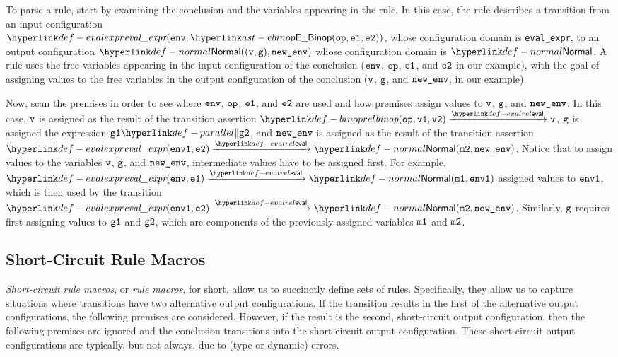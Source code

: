 To parse a rule, start by examining the conclusion and the variables appearing in the rule.
In this case, the rule describes a transition from an input configuration \\
$\evalexpr{ \env, \EBinop(\op, \veone, \vetwo) }$,
whose configuration domain is \texttt{eval\_expr}, to an output configuration $\Normal((\vv, \vg), \newenv)$
whose configuration domain is $\Normal$.
%
A rule uses the free variables appearing in the input configuration of the conclusion
($\texttt{env}$, $\texttt{op}$, $\texttt{e1}$, and $\texttt{e2}$ in our example),
with the goal of assigning values to the free variables in the output configuration
of the conclusion ($\texttt{v}$, $\texttt{g}$, and $\texttt{new\_env}$, in our example).

Now, scan the premises in order to see where $\texttt{env}$, $\texttt{op}$, $\texttt{e1}$, and $\texttt{e2}$ are used and how
premises assign values to $\texttt{v}$, $\texttt{g}$, and $\texttt{new\_env}$.
%
In this case, $\texttt{v}$ is assigned as the result of the transition assertion
$\binoprel(\op, \vvone, \vvtwo) \evalarrow \vv$,
$\texttt{g}$ is assigned the expression $\vgone \parallelcomp \vgtwo$,
and $\texttt{new\_env}$ is assigned as the result of the transition assertion
$\evalexpr{ \envone, \vetwo } \evalarrow \Normal(\vmtwo, \newenv)$.
%
Notice that to assign values to the variables $\texttt{v}$, $\texttt{g}$, and $\texttt{new\_env}$,
intermediate values have to be assigned first.
For example, $\evalexpr{ \env, \veone} \evalarrow \Normal(\vmone, \envone)$
assigned values to $\texttt{env1}$, which is then used by the transition \\
$\evalexpr{ \envone, \vetwo } \evalarrow \Normal(\vmtwo, \newenv)$.
Similarly, $\texttt{g}$ requires first assigning values to $\texttt{g1}$ and $\texttt{g2}$,
which are components of the previously assigned variables $\texttt{m1}$ and $\texttt{m2}$.

\subsection{Short-Circuit Rule Macros}

\emph{Short-circuit rule macros}, or \emph{rule macros}, for short, allow us to succinctly define sets of rules.
Specifically, they allow us to capture situations where
transitions have two alternative output configurations.
If the transition results in the first of the alternative output configurations, the following premises are considered.
However, if the result is the second, short-circuit output configuration, then the following premises are ignored
and the conclusion transitions into the short-circuit output configuration.
These short-circuit output configurations are typically, but not always, due to (type or dynamic) errors.

